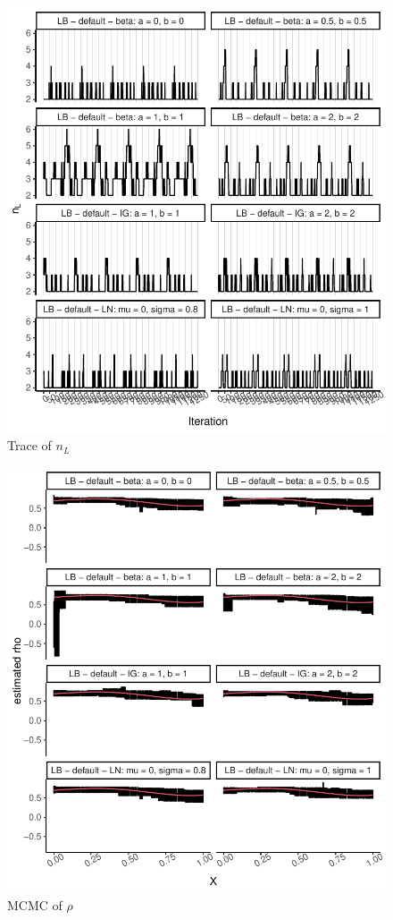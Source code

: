 \documentclass{amsart}
\begin{document}
\begin{figure}[ht]
	\centering
	\includegraphics[width=0.95\linewidth]{trace_nl_5.pdf}
	\caption{Trace of $n_L$}
	\label{fig:trace:nl:5}
\end{figure}
\iffalse
\begin{figure}[ht]
	\centering
	\includegraphics[width=0.95\linewidth]{mcmc_rho_5.pdf}
	\caption{MCMC of $\rho$}
	\label{fig:mcmc:rho:5}
\end{figure}
\end{document}
